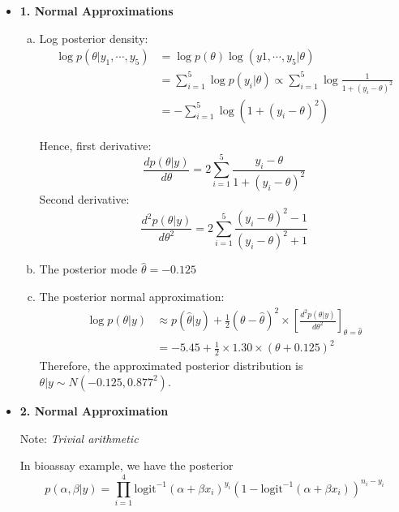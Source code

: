 \documentclass{article}
\begin{document}
\begin{itemize}

\item \textbf{1. Normal Approximations}
  \begin{enumerate}[(a)]
    \item Log posterior density:
      \begin{align*}
      \log p(\theta|y_1, \cdots, y_5) &= \log p(\theta) \log (y1, \cdots, y_5 | \theta) \\
      &= \sum_{i=1}^5 \log p(y_i | \theta) \propto \sum_{i=1}^5 \log {\frac{1}{1 + (y_i - \theta)^2}} \\
      &= -\sum_{i=1}^5 \log \left(1 + (y_i - \theta)^2 \right) 
      \end{align*}
      
      Hence, first derivative:
      $$
      \frac{d p(\theta|y)}{d\theta} = 2 \sum_{i=1}^5 \frac{y_i - \theta}{1+(y_i-\theta)^2}
      $$
      Second derivative:
      $$
      \frac{d^2 p(\theta|y)}{d\theta^2} = 2 \sum_{i=1}^5 \frac{(y_i-\theta)^2 - 1}{(y_i - \theta)^2 + 1}
      $$
    
     \item The posterior mode $ \hat \theta = -0.125$
     
     \item The posterior normal approximation:
      \begin{align*}
       \log p(\theta|y) &\approx p(\hat \theta | y) + \frac{1}{2} (\theta - \hat \theta)^2 \times \left[ \frac{d^2p(\theta|y)}{d\theta^2} \right]_{\theta = \hat \theta} \\
       &= -5.45 + \frac{1}{2} \times 1.30 \times (\theta + 0.125)^2 
     \end{align*}
     Therefore, the approximated posterior distribution is $\theta | y \sim N(-0.125, 0.877^2)$. 
    \end{enumerate}

\item \textbf{2. Normal Approximation}

 Note: \textit{Trivial arithmetic}

In bioassay example, we have the posterior 
$$
p(\alpha, \beta | y) = \prod_{i=1}^4 \text{logit}^{-1} (\alpha + \beta x_i)^{y_i} \left(1 - \text{logit}^{-1}(\alpha + \beta x_i) \right)^{n_i-y_i}
$$


\end{itemize}
\end{document}
